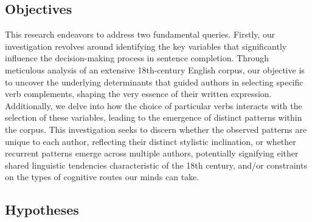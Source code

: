 \documentclass[final]{clv3} %
\begin{document}
\subsection{Objectives}

This research endeavors to address two fundamental queries. Firstly, our investigation revolves around identifying the key variables that significantly influence the decision-making process in sentence completion. Through meticulous analysis of an extensive 18th-century English corpus, our objective is to uncover the underlying determinants that guided authors in selecting specific verb complements, shaping the very essence of their written expression.
Additionally, we delve into how the choice of particular verbs interacts with the selection of these variables, leading to the emergence of distinct patterns within the corpus. This investigation seeks to discern whether the observed patterns are unique to each author, reflecting their distinct stylistic inclination, or whether recurrent patterns emerge across multiple authors, potentially signifying either shared linguistic tendencies characteristic of the 18th century, and/or constraints on the types of cognitive routes our minds can take.
\subsection{Hypotheses}
\end{document}
